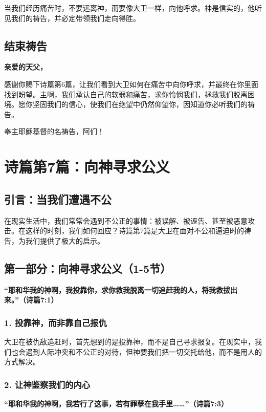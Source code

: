 \documentclass[a4paper, 12pt]{article}
\begin{document}
当我们经历痛苦时，不要远离神，而要像大卫一样，向他呼求。神是信实的，他听见我们的祷告，并必定带领我们走向得胜。

\subsection*{结束祷告}

\textbf{亲爱的天父，}

感谢你赐下诗篇第6篇，让我们看到大卫如何在痛苦中向你呼求，并最终在你里面找到盼望。主啊，我们承认自己的软弱和痛苦，求你怜悯我们，拯救我们脱离困境。愿你坚固我们的信心，使我们在绝望中仍然仰望你，因知道你必听我们的祷告。

奉主耶稣基督的名祷告，阿们！


\newpage
\section{诗篇第7篇：向神寻求公义}
\subsection*{引言：当我们遭遇不公}

在现实生活中，我们常常会遇到不公正的事情：被误解、被诬告、甚至被恶意攻击。在这样的时刻，我们如何回应？诗篇第7篇是大卫在面对不公和逼迫时的祷告，为我们提供了极大的启示。

\subsection*{第一部分：向神寻求公义（1-5节）}

\textbf{“耶和华我的神啊，我投靠你，求你救我脱离一切追赶我的人，将我救拔出来。”（诗篇7:1）}

\subsubsection*{1. 投靠神，而非靠自己报仇}

大卫在被仇敌追赶时，首先想到的是投靠神，而不是自己寻求报复。在现实中，我们也会遇到人际冲突和不公正的对待，但神要我们把一切交托给他，而不是用人的方式解决。

\subsubsection*{2. 让神鉴察我们的内心}

\textbf{“耶和华我的神啊，我若行了这事，若有罪孽在我手里……”（诗篇7:3）}
\end{document}

